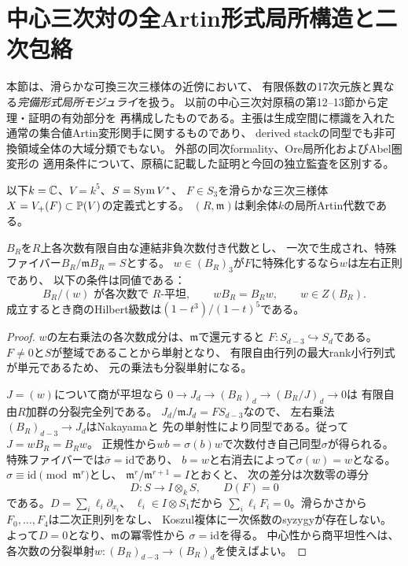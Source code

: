 \section{中心三次対の全Artin形式局所構造と二次包絡}
\label{sec:moduli-artin}
本節は、滑らかな可換三次三様体の近傍において、
有限係数の17次元族と異なる\emph{完備形式局所モジュライ}を扱う。
以前の中心三次対原稿の第12--13節から定理・証明の有効部分を
再構成したものである。主張は生成空間に標識を入れた
通常の集合値Artin変形関手に関するものであり、
derived stackの同型でも非可換領域全体の大域分類でもない。
外部の同次formality、Ore局所化およびAbel圏変形の
適用条件について、原稿に記載した証明と今回の独立監査を区別する。

以下$k=\mathbb C$、$V=k^5$、$S=\operatorname{Sym} V^*$、
$F\in S_3$を滑らかな三次三様体
$X=V_+(F)\subset\mathbb P(V)$の定義式とする。
$(R,\mathfrak m)$は剰余体$k$の局所Artin代数である。

\begin{lemma}[平坦な正規三次商は自動的に中心商]
\label{lem:artin-normal-central}
$B_R$を$R$上各次数有限自由な連結非負次数付き代数とし、
一次で生成され、特殊ファイバー$B_R/\mathfrak mB_R=S$とする。
$w\in(B_R)_3$が$F$に特殊化するなら$w$は左右正則であり、
以下の条件は同値である：
\[
 B_R/(w)\text{ が各次数で }R\text{-平坦},\qquad
 wB_R=B_Rw,\qquad
 w\in Z(B_R).
\]
成立するとき商のHilbert級数は$(1-t^3)/(1-t)^5$である。
\end{lemma}
\begin{proof}
$w$の左右乗法の各次数成分は、$\mathfrak m$で還元すると
$F:S_{d-3}\hookrightarrow S_d$である。
$F\ne0$と$S$が整域であることから単射となり、
有限自由行列の最大rank小行列式が単元であるため、
元の乗法も分裂単射になる。

$J=(w)$について商が平坦なら
$0\to J_d\to(B_R)_d\to(B_R/J)_d\to0$は
有限自由$R$加群の分裂完全列である。
$J_d/\mathfrak mJ_d=FS_{d-3}$なので、
左右乗法$(B_R)_{d-3}\to J_d$はNakayamaと
先の単射性により同型である。従って$J=wB_R=B_Rw$。
正規性から$wb=\sigma(b)w$で次数付き自己同型$\sigma$が得られる。
特殊ファイバーでは$\bar\sigma=\mathrm{id}$であり、
$b=w$と右消去によって$\sigma(w)=w$となる。
$\sigma\equiv\mathrm{id}\pmod{\mathfrak m^r}$とし、
$\mathfrak m^r/\mathfrak m^{r+1}=I$とおくと、
次の差分は次数零の導分
\[
 D:S\longrightarrow I\otimes_k S,\qquad
 D(F)=0
\]
である。$D=\sum_i\ell_i\partial_{x_i}$、
$\ell_i\in I\otimes S_1$だから
$\sum_i\ell_iF_i=0$。滑らかさから
$F_0,\ldots,F_4$は二次正則列をなし、
Koszul複体に一次係数のsyzygyが存在しない。
よって$D=0$となり、$\mathfrak m$の冪零性から
$\sigma=\mathrm{id}$を得る。
中心性から商平坦性へは、
各次数の分裂単射$w:(B_R)_{d-3}\to(B_R)_d$を使えばよい。
\end{proof}

